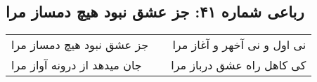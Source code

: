\begin{center}
\section*{رباعی شماره ۴۱: جز عشق نبود هیچ دمساز مرا}
\label{sec:0041}
\begin{longtable}{l p{0.5cm} r}
جز عشق نبود هیچ دمساز مرا
&&
نی اول و نی آخهر و آغاز مرا
\\
جان میدهد از درونه آواز مرا
&&
کی کاهل راه عشق درباز مرا
\\
\end{longtable}
\end{center}
